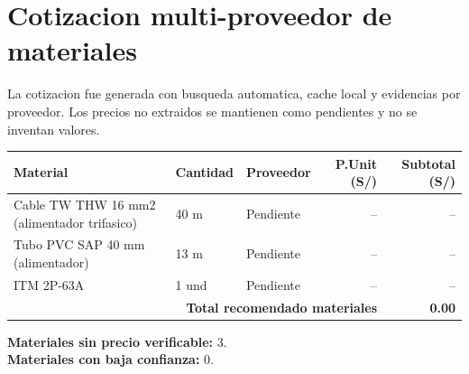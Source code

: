 \section{Cotizacion multi-proveedor de materiales}

La cotizacion fue generada con busqueda automatica, cache local y evidencias por proveedor.
Los precios no extraidos se mantienen como pendientes y no se inventan valores.

\begin{longtable}{p{6.2cm} p{1.8cm} p{2.5cm} r r}
\toprule
\textbf{Material} & \textbf{Cantidad} & \textbf{Proveedor} & \textbf{P.Unit (S/)} & \textbf{Subtotal (S/)} \\
\midrule
Cable TW THW 16 mm2 (alimentador trifasico) & 40 m & Pendiente & -- & -- \\
Tubo PVC SAP 40 mm (alimentador) & 13 m & Pendiente & -- & -- \\
ITM 2P-63A & 1 und & Pendiente & -- & -- \\
\midrule
\multicolumn{4}{r}{\textbf{Total recomendado materiales}} & \textbf{0.00} \\
\bottomrule
\end{longtable}

\noindent\textbf{Materiales sin precio verificable:} 3.\\
\textbf{Materiales con baja confianza:} 0.
